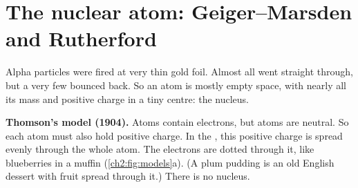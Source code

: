 \section{The nuclear atom: Geiger--Marsden and Rutherford}\label{ch2:sec:nucleus}

\begin{bigidea}
Alpha particles were fired at very thin gold foil. Almost all went straight
through, but a very few bounced back. So an atom is mostly empty space, with
nearly all its mass and positive charge in a tiny centre: the nucleus.
\end{bigidea}

\begin{keywords}
\end{keywords}

\textbf{Thomson's model (1904).} Atoms contain electrons, but atoms are neutral.
So each atom must also hold positive charge. In the ,
this positive charge is spread evenly through the whole atom. The electrons are
dotted through it, like blueberries in a muffin (\cref{ch2:fig:models}a). (A plum
pudding is an old English dessert with fruit spread through it.) There is no nucleus.

